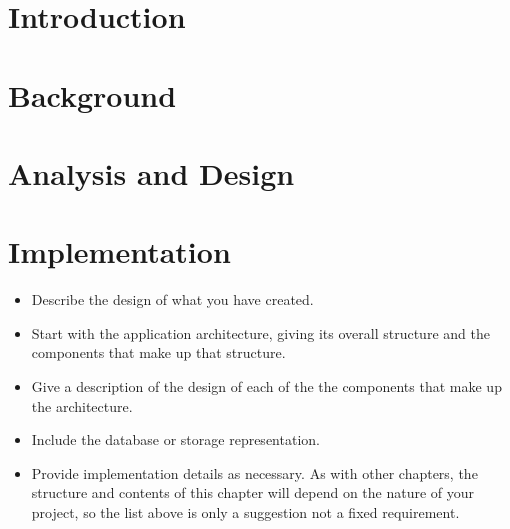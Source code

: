 \documentclass[ openright,titlepage,numbers=noenddot,headinclude,%
                footinclude=true,BCOR=5mm,paper=a4,fontsize=12pt,a4paper,english%
                ]{scrreprt}
\begin{document}




\pagestyle{scrheadings}

\chapter{Introduction}
\label{Chapters/Introduction}






\chapter{Background}
\label{Chapters/Background}





\chapter{Analysis and Design}
\label{Chapters/Analysis-and-Design}





\chapter{Implementation}
\label{Chapters/Implementation}

\begin{itemize}
\item Describe the design of what you have created.
\item Start with the application architecture, giving its overall structure and the components that make up that structure.
\item Give a description of the design of each of the the components that make up the architecture.
\item Include the database or storage representation.
\item Provide implementation details as necessary.
As with other chapters, the structure and contents of this chapter will depend on the nature of your project, so the list above is only a suggestion not a fixed requirement.
\end{itemize}
\end{document}
